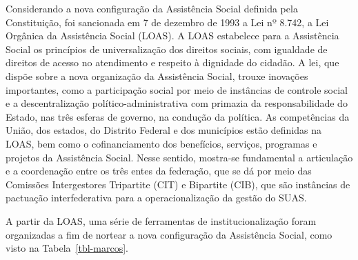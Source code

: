 \documentclass[
  letterpaper,
  DIV=11,
  numbers=noendperiod]{scrreprt}
\begin{document}
Considerando a nova configuração da Assistência Social definida pela
Constituição, foi sancionada em 7 de dezembro de 1993 a Lei nº 8.742, a
Lei Orgânica da Assistência Social (LOAS). A LOAS estabelece para a
Assistência Social os princípios de universalização dos direitos
sociais, com igualdade de direitos de acesso no atendimento e respeito à
dignidade do cidadão. A lei, que dispõe sobre a nova organização da
Assistência Social, trouxe inovações importantes, como a participação
social por meio de instâncias de controle social e a descentralização
político-administrativa com primazia da responsabilidade do Estado, nas
três esferas de governo, na condução da política. As competências da
União, dos estados, do Distrito Federal e dos municípios estão definidas
na LOAS, bem como o cofinanciamento dos benefícios, serviços, programas
e projetos da Assistência Social. Nesse sentido, mostra-se fundamental a
articulação e a coordenação entre os três entes da federação, que se dá
por meio das Comissões Intergestores Tripartite (CIT) e Bipartite (CIB),
que são instâncias de pactuação interfederativa para a operacionalização
da gestão do SUAS.

A partir da LOAS, uma série de ferramentas de institucionalização foram
organizadas a fim de nortear a nova configuração da Assistência Social,
como visto na Tabela~\ref{tbl-marcos}.
\end{document}
